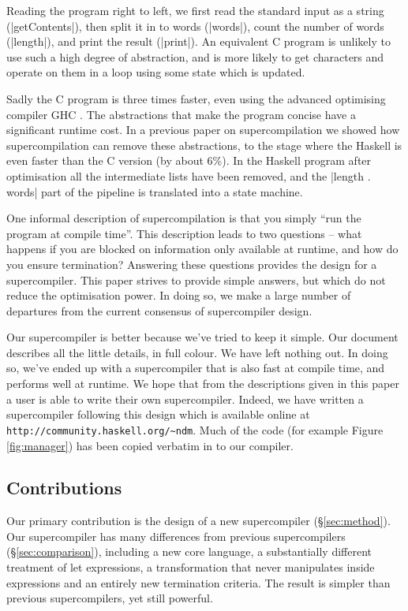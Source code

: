 \documentclass[draft]{sigplanconf}
\begin{document}
Reading the program right to left, we first read the standard input as a string (|getContents|), then split it in to words (|words|), count the number of words (|length|), and print the result (|print|). An equivalent C program is unlikely to use such a high degree of abstraction, and is more likely to get characters and operate on them in a loop using some state which is updated.

Sadly the C program is three times faster, even using the advanced optimising compiler GHC \cite{GHC}. The abstractions that make the program concise have a significant runtime cost. In a previous paper on supercompilation \cite{me:supero} we showed how supercompilation can remove these abstractions, to the stage where the Haskell is even faster than the C version (by about 6\%). In the Haskell program after optimisation all the intermediate lists have been removed, and the |length . words| part of the pipeline is translated into a state machine.

One informal description of supercompilation is that you simply ``run the program at compile time''. This description leads to two questions -- what happens if you are blocked on information only available at runtime, and how do you ensure termination? Answering these questions provides the design for a supercompiler. This paper strives to provide simple answers, but which do not reduce the optimisation power. In doing so, we make a large number of departures from the current consensus of supercompiler design.

Our supercompiler is better because we've tried to keep it simple. Our document describes all the little details, in full colour. We have left nothing out. In doing so, we've ended up with a supercompiler that is also fast at compile time, and performs well at runtime. We hope that from the descriptions given in this paper a user is able to write their own supercompiler. Indeed, we have written a supercompiler following this design which is available online at \verb"http://community.haskell.org/~ndm". Much of the code (for example Figure \ref{fig:manager}) has been copied verbatim in to our compiler.

\subsection{Contributions}

Our primary contribution is the design of a new supercompiler (\S\ref{sec:method}). Our supercompiler has many differences from previous supercompilers (\S\ref{sec:comparison}), including a new core language, a substantially different treatment of let expressions, a transformation that never manipulates inside expressions and an entirely new termination criteria. The result is simpler than previous supercompilers, yet still powerful.
\end{document}
